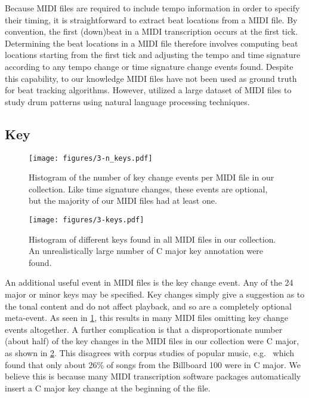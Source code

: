 Because MIDI files are required to include tempo information in order to specify their timing, it is straightforward to extract beat locations from a MIDI file.
By convention, the first (down)beat in a MIDI transcription occurs at the first tick.
Determining the beat locations in a MIDI file therefore involves computing beat locations starting from the first tick and adjusting the tempo and time signature according to any tempo change or time signature change events found.
Despite this capability, to our knowledge MIDI files have not been used as ground truth for beat tracking algorithms.  %
However, \cite{mauch2012corpus} utilized a large dataset of MIDI files to study drum patterns using natural language processing techniques.


\subsection{Key}
\label{sec:key}

\begin{figure}
  \centering
  \texttt{[image: figures/3-n\_keys.pdf]}
  \caption[Histogram of the number of key changes in MIDI files]{Histogram of the number of key change events per MIDI file in our collection.
Like time signature changes, these events are optional, but the majority of our MIDI files had at least one.}
    \label{fig:3-n_keys}
\end{figure}

\begin{figure}
  \centering
  \texttt{[image: figures/3-keys.pdf]}
  \caption[Histogram of keys]{Histogram of different keys found in all MIDI files in our collection.
An unrealistically large number of C major key annotation were found.}
    \label{fig:3-keys}
\end{figure}

An additional useful event in MIDI files is the key change event.
Any of the 24 major or minor keys may be specified.
Key changes simply give a suggestion as to the tonal content and do not affect playback, and so are a completely optional meta-event.
As seen in \cref{fig:3-n_keys}, this results in many MIDI files omitting key change events altogether.
A further complication is that a disproportionate number (about half) of the key changes in the MIDI files in our collection were C major, as shown in \cref{fig:3-keys}.
This disagrees with corpus studies of popular music, e.g.\ \cite{carlton2012analyzed} which found that only about 26\% of songs from the Billboard 100 were in C major.
We believe this is because many MIDI transcription software packages automatically insert a C major key change at the beginning of the file.

